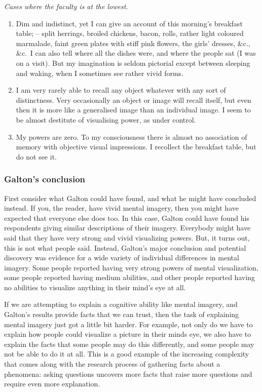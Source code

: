 \documentclass[
  oneside,
  12pt]{crumpbook}
\begin{document}
\emph{Cases where the faculty is at the lowest.}

\begin{enumerate}
\def\labelenumi{\arabic{enumi}.}
\setcounter{enumi}{88}
\item
  Dim and indistinct, yet I can give an account of this morning's breakfast table; -- split herrings, broiled chickens, bacon, rolls, rather light coloured marmalade, faint green plates with stiff pink flowers, the girls' dresses, \&c., \&c.~I can also tell where all the dishes were, and where the people sat (I was on a visit). But my imagination is seldom pictorial except between sleeping and waking, when I sometimes see rather vivid forms.
\item
  I am very rarely able to recall any object whatever with any sort of distinctness. Very occasionally an object or image will recall itself, but even then it is more like a generalised image than an individual image. I seem to be almost destitute of visualising power, as under control.
\item
  My powers are zero. To my consciousness there is almost no association of memory with objective visual impressions. I recollect the breakfast table, but do not see it.
\end{enumerate}

\hypertarget{galtons-conclusion}{%
\subsubsection{Galton's conclusion}\label{galtons-conclusion}}

First consider what Galton could have found, and what he might have concluded instead. If you, the reader, have vivid mental imagery, then you might have expected that everyone else does too. In this case, Galton could have found his respondents giving similar descriptions of their imagery. Everybody might have said that they have very strong and vivid visualizing powers. But, it turns out, this is not what people said. Instead, Galton's major conclusion and potential discovery was evidence for a wide variety of individual differences in mental imagery. Some people reported having very strong powers of mental visualization, some people reported having medium abilities, and other people reported having no abilities to visualize anything in their mind's eye at all.

If we are attempting to explain a cognitive ability like mental imagery, and Galton's results provide facts that we can trust, then the task of explaining mental imagery just got a little bit harder. For example, not only do we have to explain how people could visualize a picture in their minds eye, we also have to explain the facts that some people may do this differently, and some people may not be able to do it at all. This is a good example of the increasing complexity that comes along with the research process of gathering facts about a phenomena: asking questions uncovers more facts that raise more questions and require even more explanation.
\end{document}
